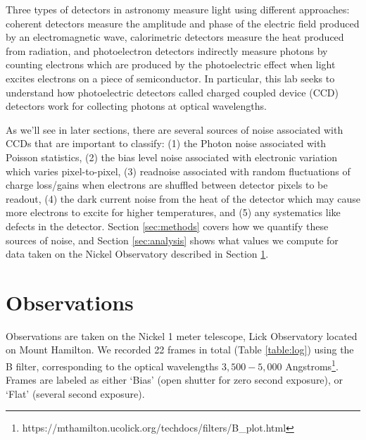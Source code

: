 \documentclass[preprint]{aastex62}
\begin{document}
Three types of detectors in astronomy measure light using different approaches: coherent detectors measure the amplitude and phase of the electric field produced by an electromagnetic wave, calorimetric detectors measure the heat produced from radiation, and photoelectron detectors indirectly measure photons by counting electrons which are produced by the photoelectric effect when light excites electrons on a piece of semiconductor. In particular, this lab seeks to understand how photoelectric detectors called charged coupled device (CCD) detectors work for collecting photons at optical wavelengths.

As we'll see in later sections, there are several sources of noise associated with CCDs that are important to classify: (1) the Photon noise associated with Poisson statistics, (2) the bias level noise associated with electronic variation which varies pixel-to-pixel, (3) readnoise associated with random fluctuations of charge loss/gains when electrons are shuffled between detector pixels to be readout, (4) the dark current noise from the heat of the detector which may cause more electrons to excite for higher temperatures, and (5) any systematics like defects in the detector. Section \ref{sec:methods} covers how we quantify these sources of noise, and Section \ref{sec:analysis} shows what values we compute for data taken on the Nickel Observatory described in Section \ref{sec:observations}. 

\section{Observations} \label{sec:observations}
Observations are taken on the Nickel 1 meter telescope, Lick Observatory located on Mount Hamilton. We recorded 22 frames in total (Table \ref{table:log}) using the B filter, corresponding to the optical wavelengths $3,500-5,000$ Angstroms\footnote{https://mthamilton.ucolick.org/techdocs/filters/B\_plot.html}. Frames are labeled as either `Bias' (open shutter for zero second exposure), or `Flat' (several second exposure).
\end{document}
